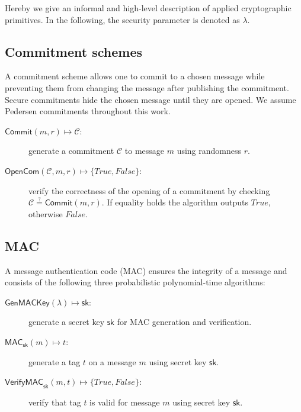 \documentclass[a4paper]{article}
\begin{document}
Hereby we give an informal and high-level description of applied cryptographic primitives. In the following, the security parameter is denoted as $\lambda$.

\subsection{Commitment schemes}
A commitment scheme allows one to commit to a chosen message while preventing them from changing the message after publishing the commitment. Secure commitments hide the chosen message until they are opened. We assume Pedersen commitments throughout this work.

\begin{description}

\item[$\mathsf{Commit}(m,r)\mapsto{}\mathcal{C}$:] generate a commitment $\mathcal{C}$ to message $m$ using randomness $r$.

\item[$\mathsf{OpenCom}(\mathcal{C},m,r)\mapsto{}\{\mathit{True},\mathit{False}\}$:] verify the correctness of the opening of a commitment by checking $\mathcal{C}\stackrel{?}{=}\mathsf{Commit}(m,r)$. If equality holds the algorithm outputs $\mathit{True}$, otherwise $\mathit{False}$.

\end{description}

\subsection{MAC}
A message authentication code (MAC) ensures the integrity of a message and consists of the following three probabilistic polynomial-time algorithms:

\begin{description}

\item[$\mathsf{GenMACKey}(\lambda)\mapsto{}{\mathsf{sk}}$:] generate a secret key $\mathsf{sk}$ for MAC generation and verification.

\item[$\mathsf{MAC}_{\mathsf{sk}}(m)\mapsto{}t$:] generate a tag $t$ on a message $m$ using secret key $\mathsf{sk}$.

\item[$\mathsf{VerifyMAC}_{\mathsf{sk}}(m,t)\mapsto{}\{\mathit{True},\mathit{False}\}$:] verify that tag $t$ is valid for message $m$ using secret key $\mathsf{sk}$.

\end{description}
\end{document}
